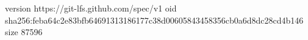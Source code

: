 version https://git-lfs.github.com/spec/v1
oid sha256:feba64c2e83bfb64691313186177c38d00605843458356cb0a6d8dc28cd4b146
size 87596
